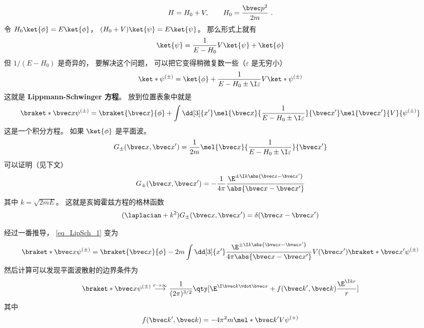 

\begin{equation}
H = H_0 + V, \qquad H_0 = \frac{\bvec p^2}{2m}~.
\end{equation}
令 $H_0\ket{\phi} = E\ket{\phi}$， $(H_0+V)\ket{\psi}=E\ket{\psi}$。 那么形式上就有
\begin{equation}
\ket{\psi} = \frac{1}{E-H_0} V\ket{\psi} + \ket{\phi}
\end{equation}
但 $1/(E-H_0)$ 是奇异的， 要解决这个问题， 可以把它变得稍微复数一些（$\varepsilon$ 是无穷小）
\begin{equation}
\ket*{\psi^{(\pm)}} = \ket{\phi} + \frac{1}{E-H_0\pm \I\varepsilon} V \ket*{\psi^{(\pm)}}
\end{equation}
这就是 \textbf{Lippmann-Schwinger 方程}。 放到位置表象中就是
\begin{equation}\label{eq_LipSch_1}
\braket*{\bvec x}{\psi^{(\pm)}} = \braket{\bvec x}{\phi} + \int \dd[3]{x'} \mel{\bvec x}{\frac{1}{E-H_0\pm \I\varepsilon}}{\bvec x'} \mel{\bvec x'}{V}{\psi^{(\pm)}}
\end{equation}
这是一个积分方程。 如果 $\ket{\phi}$ 是平面波。
\begin{equation}\label{eq_LipSch_2}
G_\pm (\bvec x, \bvec x') = \frac{1}{2m} \mel{\bvec x}{\frac{1}{E-H_0\pm \I\varepsilon}}{\bvec x'}
\end{equation}
可以证明（见下文）
\begin{equation}\label{eq_LipSch_3}
G_\pm (\bvec x, \bvec x') = -\frac{1}{4\pi} \frac{\E^{\pm\I k\abs{\bvec x-\bvec x'}}}{\abs{\bvec x-\bvec x'}}
\end{equation}
其中 $k = \sqrt{2mE}$。 这就是亥姆霍兹方程的格林函数
\begin{equation}
(\laplacian +k^2)G_\pm (\bvec x, \bvec x') = \delta(\bvec x-\bvec x')
\end{equation}

经过一番推导， \autoref{eq_LipSch_1} 变为
\begin{equation}
\braket*{\bvec x}{\psi^{(\pm)}} = \braket{\bvec x}{\phi} - 2m\int \dd[3]{x'} \frac{\E^{\pm\I k\abs{\bvec x-\bvec x'}}}{4\pi\abs{\bvec x-\bvec x'}} V(\bvec x')\braket*{\bvec x'}{\psi^{(\pm)}}
\end{equation}
然后计算可以发现平面波散射的边界条件为
\begin{equation}
\braket*{\bvec x}{\psi^{(\pm)}} \overset{r\to\infty}{\longrightarrow} \frac{1}{(2\pi)^{3/2}} \qty[\E^{\I \bvec k\vdot \bvec x} + f(\bvec k', \bvec k)\frac{\E^{\I kr}}{r}]
\end{equation}
其中
\begin{equation}
f(\bvec k', \bvec k) = -4\pi^2 m \mel*{\bvec k'}{V}{\psi^{(+)}}
\end{equation}

